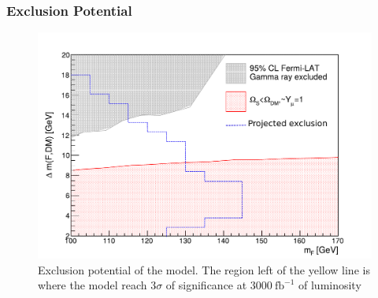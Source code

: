 \documentclass{beamer}
\begin{document}
\begin{frame}

\frametitle{Exclusion Potential}

\begin{figure}
	\centering
	
	\includegraphics[scale=0.45]{pictures/LimitPlotsTesis_WithData} 
	\caption{Exclusion potential of the model. The region left of the yellow line is where the model reach $3\sigma$ of significance at $3000~\text{fb}^{-1}$ of luminosity}
	\label{results2}
\end{figure}

\end{frame}

\end{document}
